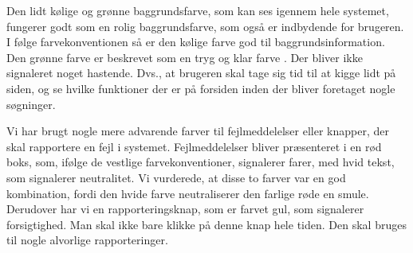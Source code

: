 Den lidt kølige og grønne baggrundsfarve, som kan ses igennem hele systemet, fungerer godt som en rolig baggrundsfarve, som også er indbydende for brugeren. I følge farvekonventionen så er den kølige farve god til baggrundsinformation. Den grønne farve er beskrevet som en tryg og klar farve \cite[p. ~344]{deb}. Der bliver ikke signaleret noget hastende. Dvs., at brugeren skal tage sig tid til at kigge lidt på siden, og se hvilke funktioner der er på forsiden inden der bliver foretaget nogle søgninger.

Vi har brugt nogle mere advarende farver til \fx fejlmeddelelser eller knapper, der skal rapportere en fejl i systemet. Fejlmeddelelser bliver præsenteret i en rød boks, som, ifølge de vestlige farvekonventioner, signalerer farer, med hvid tekst, som signalerer neutralitet. Vi vurderede, at disse to farver var en god kombination, fordi den hvide farve neutraliserer den farlige røde en smule. Derudover har vi en rapporteringsknap, som er farvet gul, som signalerer forsigtighed. Man skal ikke bare klikke på denne knap hele tiden. Den skal bruges til nogle alvorlige rapporteringer.